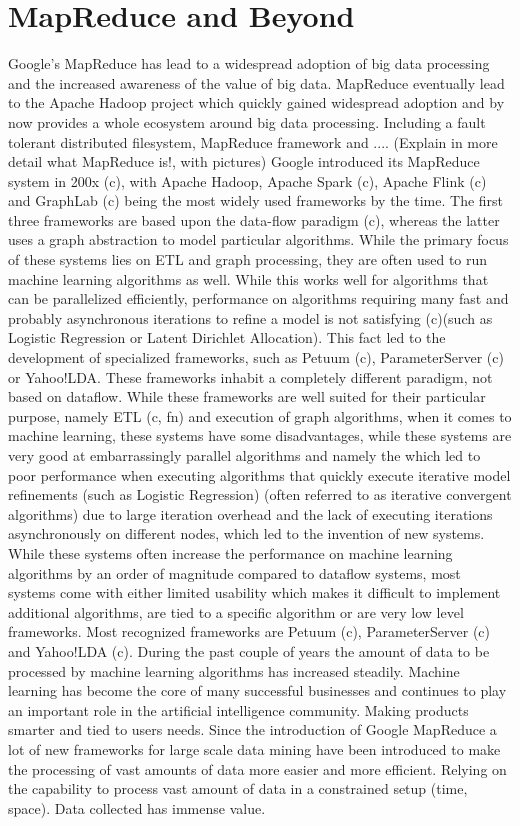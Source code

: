 \section{MapReduce and Beyond}
Google's MapReduce has lead to a widespread adoption of big data processing and the increased awareness of the value of big data. MapReduce eventually lead to the Apache Hadoop project which quickly gained widespread adoption and by now provides a whole ecosystem around big data processing. Including a fault tolerant distributed filesystem, MapReduce framework and ....
(Explain in more detail what MapReduce is!, with pictures)
Google introduced its MapReduce system in 200x (c), with Apache Hadoop, Apache Spark (c), Apache Flink (c) and GraphLab (c) being the most widely used frameworks by the time. The first three frameworks are based upon the data-flow paradigm (c), whereas the latter uses a graph abstraction to model particular algorithms. While the primary focus of these systems lies on ETL and graph processing, they are often used to run machine learning algorithms as well. While this works well for algorithms that can be parallelized efficiently, performance on algorithms requiring many fast and probably asynchronous iterations to refine a model is not satisfying (c)(such as Logistic Regression or Latent Dirichlet Allocation). This fact led to the development of specialized frameworks, such as Petuum (c), ParameterServer (c) or Yahoo!LDA. These frameworks inhabit a completely different paradigm, not based on dataflow. While these frameworks are well suited for their particular purpose, namely ETL (c, fn) and execution of graph algorithms, when it comes to machine learning, these systems have some disadvantages, while these systems are very good at embarrassingly parallel algorithms and  namely the which led to poor performance when executing algorithms that quickly execute iterative model refinements (such as Logistic Regression) (often referred to as iterative convergent algorithms) due to large iteration overhead and the lack of executing iterations asynchronously on different nodes, which led to the invention of new systems. While these systems often increase the performance on machine learning algorithms by an order of magnitude compared to dataflow systems, most systems come with either limited usability which makes it difficult to implement additional algorithms, are tied to a specific algorithm or are very low level frameworks. Most recognized frameworks are Petuum (c), ParameterServer (c) and Yahoo!LDA (c).
During the past couple of years the amount of data to be processed by machine learning algorithms has increased steadily. Machine learning has become the core of many successful businesses and continues to play an important role in the artificial intelligence community. Making products smarter and tied to users needs. Since the introduction of Google MapReduce a lot of new frameworks for large scale data mining have been introduced to make the processing of vast amounts of data more easier and more efficient. Relying on the capability to process vast amount of data in a constrained setup (time, space). Data collected has immense value.

